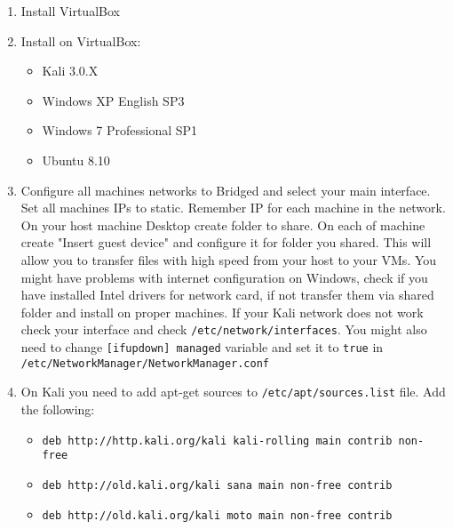 \documentclass{article}[12pt]
\begin{document}
\begin{enumerate}
\item{Install VirtualBox}
\item{Install on VirtualBox:}
\begin{itemize}
\item{Kali 3.0.X}
\item{Windows XP English SP3}
\item{Windows 7 Professional SP1}
\item{Ubuntu 8.10}
\end{itemize}
\item{Configure all machines networks to Bridged and select your main interface. Set all machines IPs to static. Remember IP for each machine in the network.
On your host machine Desktop create folder to share. On each of machine create "Insert guest device" and configure it for folder you shared. This will allow you to transfer files with high speed from your host
to your VMs. You might have problems with internet configuration on Windows, check if you have installed Intel drivers for network card, if not transfer them via shared folder and install on proper machines. If your Kali network does not work check your interface and check
\texttt{/etc/network/interfaces}. You might also need to change \texttt{[ifupdown] managed} variable and set it to \texttt{true} in \texttt{/etc/NetworkManager/NetworkManager.conf}}

\item{On Kali you need to add apt-get sources to \texttt{/etc/apt/sources.list} file. Add the following:

\begin{itemize}
\item{\texttt{deb http://http.kali.org/kali kali-rolling main contrib non-free}}
\item{\texttt{deb http://old.kali.org/kali sana main non-free contrib}}
\item{\texttt{deb http://old.kali.org/kali moto main non-free contrib}}
\end{itemize}

}
\end{enumerate}
\end{document}
